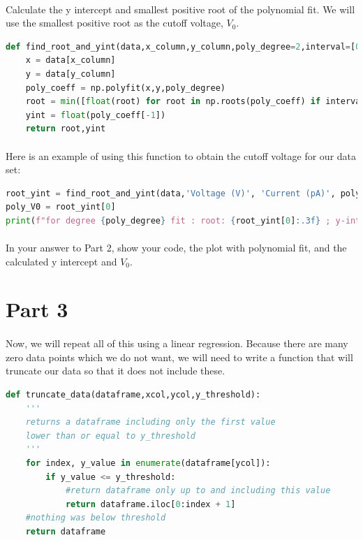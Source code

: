 \documentclass{journal}
\begin{document}
\paragraph{}
Calculate the y intercept and smallest positive root of the polynomial fit. We will use the smallest positive root as the cutoff voltage, $V_0$.
\begin{lstlisting}[language=python]
def find_root_and_yint(data,x_column,y_column,poly_degree=2,interval=[0,np.inf]):
    x = data[x_column]
    y = data[y_column]
    poly_coeff = np.polyfit(x,y,poly_degree)
    root = min([float(root) for root in np.roots(poly_coeff) if interval[0] < root and root < interval[1]])
    yint = float(poly_coeff[-1])
    return root,yint
\end{lstlisting}
\paragraph{}
Here is an example of using this function to obtain the cutoff voltage for our data set:
\begin{lstlisting}[language=python]
root_yint = find_root_and_yint(data,'Voltage (V)', 'Current (pA)', poly_degree)
poly_V0 = root_yint[0]
print(f"for degree {poly_degree} fit : root: {root_yint[0]:.3f} ; y-intercept: {root_yint[1]:.3f}")
\end{lstlisting}
\paragraph{}
In your answer to Part 2, show your code, the plot with polynomial fit, and the calculated y intercept and $V_0$.

\break{}
\section*{Part 3}
\paragraph{}
Now, we will repeat all of this using a linear regression. Because there are many zero data points which we do not want, we will need to write a function that will truncate our data so that it does not include these.
\begin{lstlisting}[language=python]
def truncate_data(dataframe,xcol,ycol,y_threshold):
    '''
    returns a dataframe including only the first value
    lower than or equal to y_threshold
    '''
    for index, y_value in enumerate(dataframe[ycol]):
        if y_value <= y_threshold:
            #return dataframe only up to and including this value
            return dataframe.iloc[0:index + 1]
    #nothing was below threshold
    return dataframe
\end{lstlisting}
\end{document}
